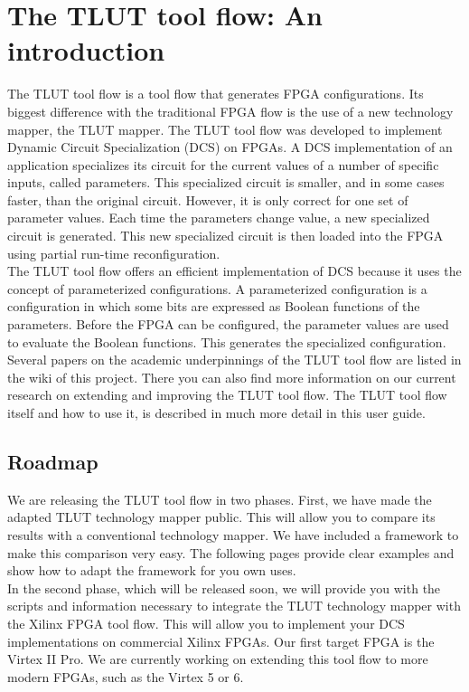 \documentclass[a4paper,oneside]{memoir}
\begin{document}
\let\clearforchapter\par %
\chapter{The TLUT tool flow: An introduction}

The TLUT tool flow is a tool flow that generates FPGA configurations. Its biggest difference with the traditional FPGA flow is the use of a new technology mapper, the TLUT mapper. The TLUT tool flow was developed to implement Dynamic Circuit Specialization (DCS) on FPGAs. A DCS implementation of an application specializes its circuit for the current values of a number of specific inputs, called parameters. This specialized circuit is smaller, and in some cases faster, than the original circuit. However, it is only correct for one set of parameter values. Each time the parameters change value, a new specialized circuit is generated. This new specialized circuit is then loaded into the FPGA using partial run-time reconfiguration.\\

The TLUT tool flow offers an efficient implementation of DCS because it uses the concept of parameterized configurations. A parameterized configuration is a configuration in which some bits are expressed as Boolean functions of the parameters. Before the FPGA can be configured, the parameter values are used to evaluate the Boolean functions. This generates the specialized configuration. Several papers on the academic underpinnings of the TLUT tool flow are listed in the wiki of this project. There you can also find more information on our current research on extending and improving the TLUT tool flow. The TLUT tool flow itself and how to use it, is described in much more detail in this user guide.

\section{Roadmap}

We are releasing the TLUT tool flow in two phases. First, we have made the adapted TLUT technology mapper public. This will allow you to compare its results with a conventional technology mapper. We have included a framework to make this comparison very easy. The following pages provide clear examples and show how to adapt the framework for you own uses.\\

In the second phase, which will be released soon, we will provide you with the scripts and information necessary to integrate the TLUT technology mapper with the Xilinx FPGA tool flow. This will allow you to implement your DCS implementations on commercial Xilinx FPGAs. Our first target FPGA is the Virtex II Pro. We are currently working on extending this tool flow to more modern FPGAs, such as the Virtex 5 or 6.
\end{document}
